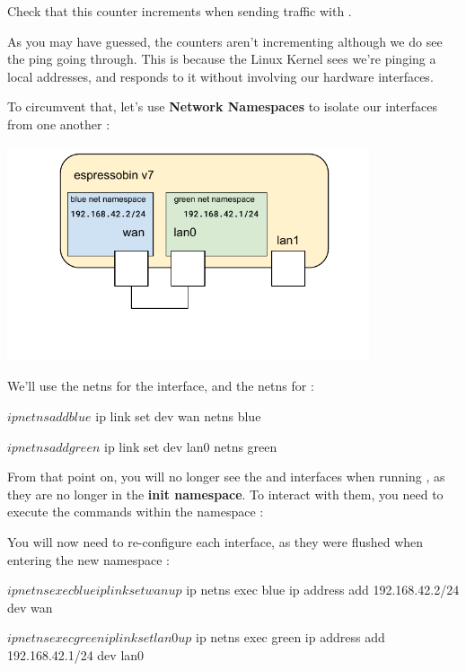 
Check that this counter increments when sending traffic with .

As you may have guessed, the counters aren't incrementing although we do see the ping
going through. This is because the Linux Kernel sees we're pinging a local addresses, and responds to it
without involving our hardware interfaces.

To circumvent that, let's use \textbf{Network Namespaces} to isolate our interfaces from one another :

\begin{center}
\includegraphics[width=0.8\textwidth]{labs/networking-stack/05_LAB1_espressobin_loopback_netns.pdf}
\end{center}

We'll use the  netns for the  interface, and the  netns for  :

\begin{targetbashinput}
$ ip netns add blue
$ ip link set dev wan netns blue

$ ip netns add green
$ ip link set dev lan0 netns green
\end{targetbashinput}

From that point on, you will no longer see the  and  interfaces when running , as they are no longer in the \textbf{init namespace}. To interact with them, you need to execute the commands within the namespace :


You will now need to re-configure each interface, as they were flushed when entering the new namespace :

\begin{targetbashinput}
$ ip netns exec blue ip link set wan up
$ ip netns exec blue ip address add 192.168.42.2/24 dev wan

$ ip netns exec green ip link set lan0 up
$ ip netns exec green ip address add 192.168.42.1/24 dev lan0
\end{targetbashinput}

